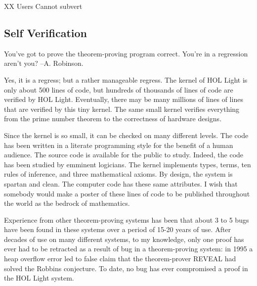 \documentclass{llncs}
\begin{document}
XX Users Cannot subvert

\subsection{Self Verification}

{\narrower\it  

You've got to prove the theorem-proving program correct. You're in a regression aren't you?
--A. Robinson.

}

\smallskip

Yes, it is a regress; but a rather manageable regress.  The kernel of HOL Light
is only about 500 lines of code, but hundreds of thousands of lines of code  are
verified by HOL Light.  Eventually, there may be many millions of lines of lines that are
verified by this tiny kernel.  The same small kernel verifies everything from
the prime number theorem to the correctness of hardware designs.

Since the kernel is so small, it can be checked on many different levels.  The
code has been written in a literate programming style for the benefit
of a human audience.  The source code is available for the public to study.   Indeed, the code
has been studied by emminent logicians.  The kernel implements types, terms,  ten rules
of inference,  and three mathematical axioms.  By design, the system is spartan
and clean.  The computer code has these same attributes.  I wish that somebody would
make a poster of these lines of code to be published throughout the world as
the bedrock of mathematics.

Experience from other theorem-proving systems has been that about 3 to 5 bugs have been found
in these systems over a period of 15-20 years of use.  After decades of use on many different
systems, to my knowledge, only one proof
has ever had to be retracted as a result of bug in a theorem-proving system:  in 1995
a heap overflow error led to false claim that the theorem-prover REVEAL had solved the Robbins
conjecture. %
To date, no bug has ever compromised a
proof in the HOL Light system.
\end{document}
